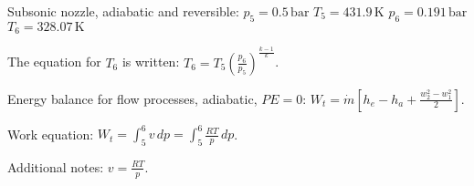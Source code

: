 Subsonic nozzle, adiabatic and reversible:  
\( p_5 = 0.5 \, \text{bar} \)  
\( T_5 = 431.9 \, \text{K} \)  
\( p_6 = 0.191 \, \text{bar} \)  
\( T_6 = 328.07 \, \text{K} \)  

The equation for \( T_6 \) is written:  
\( T_6 = T_5 \left( \frac{p_6}{p_5} \right)^{\frac{k-1}{k}} \).  

Energy balance for flow processes, adiabatic, \( PE = 0 \):  
\( W_t = \dot{m} \left[ h_e - h_a + \frac{w_2^2 - w_1^2}{2} \right] \).  

Work equation:  
\( W_t = \int_5^6 v \, dp = \int_5^6 \frac{R T}{p} \, dp \).  

Additional notes:  
\( v = \frac{RT}{p} \).